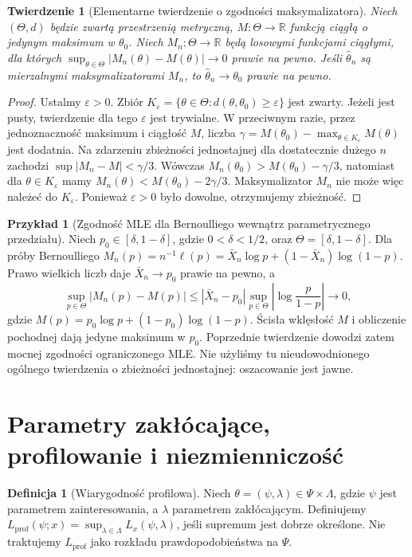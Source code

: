 \documentclass[11pt,a4paper,oneside]{report}
\numberwithin{equation}{chapter}
\theoremstyle{plain}
\newtheorem{twierdzenie}{Twierdzenie}[chapter]
\theoremstyle{definition}
\newtheorem{definicja}{Definicja}[chapter]
\newtheorem{przyklad}{Przykład}[chapter]
\theoremstyle{remark}
\newcommand{\R}{\mathbb R}
\begin{document}
\begin{twierdzenie}[Elementarne twierdzenie o zgodności maksymalizatora]\label{thm:argmax-consistency}
Niech $(\Theta,d)$ będzie zwartą przestrzenią metryczną,
$M:\Theta\to\R$ funkcją ciągłą o jedynym maksimum w $\theta_0$.
Niech $M_n:\Theta\to\R$ będą losowymi funkcjami ciągłymi, dla których
$\sup_{\theta\in\Theta}|M_n(\theta)-M(\theta)|\to0$ prawie na pewno.
Jeśli $\widehat\theta_n$ są mierzalnymi maksymalizatorami $M_n$, to
$\widehat\theta_n\to\theta_0$ prawie na pewno.
\end{twierdzenie}
\begin{proof}
Ustalmy $\varepsilon>0$. Zbiór
$K_\varepsilon=\{\theta\in\Theta:d(\theta,\theta_0)\ge\varepsilon\}$
jest zwarty. Jeżeli jest pusty, twierdzenie dla tego $\varepsilon$
jest trywialne. W przeciwnym razie, przez jednoznaczność maksimum
i ciągłość $M$, liczba
$\gamma=M(\theta_0)-\max_{\theta\in K_\varepsilon}M(\theta)$
jest dodatnia. Na zdarzeniu zbieżności jednostajnej dla dostatecznie
dużego $n$ zachodzi $\sup|M_n-M|<\gamma/3$.
Wówczas $M_n(\theta_0)>M(\theta_0)-\gamma/3$, natomiast dla
$\theta\in K_\varepsilon$ mamy
$M_n(\theta)<M(\theta_0)-2\gamma/3$.
Maksymalizator $M_n$ nie może więc należeć do $K_\varepsilon$.
Ponieważ $\varepsilon>0$ było dowolne, otrzymujemy zbieżność.
\end{proof}

\begin{przyklad}[Zgodność MLE dla Bernoulliego wewnątrz parametrycznego przedziału]
Niech $p_0\in[\delta,1-\delta]$, gdzie $0<\delta<1/2$, oraz
$\Theta=[\delta,1-\delta]$. Dla próby Bernoulliego
$M_n(p)=n^{-1}\ell(p)=\bar X_n\log p+(1-\bar X_n)\log(1-p)$.
Prawo wielkich liczb daje $\bar X_n\to p_0$ prawie na pewno, a
\[
\sup_{p\in\Theta}|M_n(p)-M(p)|
\le |\bar X_n-p_0|
\sup_{p\in\Theta}\left|\log\frac p{1-p}\right|\longrightarrow0,
\]
gdzie $M(p)=p_0\log p+(1-p_0)\log(1-p)$.
Ścisła wklęsłość $M$ i obliczenie pochodnej dają jedyne maksimum
w $p_0$. Poprzednie twierdzenie dowodzi zatem mocnej zgodności
ograniczonego MLE. Nie użyliśmy tu nieudowodnionego ogólnego twierdzenia
o zbieżności jednostajnej: oszacowanie jest jawne.
\end{przyklad}

\section{Parametry zakłócające, profilowanie i niezmienniczość}
\begin{definicja}[Wiarygodność profilowa]
Niech $\theta=(\psi,\lambda)\in\Psi\times\Lambda$, gdzie $\psi$ jest
parametrem zainteresowania, a $\lambda$ parametrem zakłócającym.
Definiujemy $L_{\mathrm{prof}}(\psi;x)=\sup_{\lambda\in\Lambda}
L_x(\psi,\lambda)$, jeśli supremum jest dobrze określone.
Nie traktujemy $L_{\mathrm{prof}}$ jako rozkładu prawdopodobieństwa na $\Psi$.
\end{definicja}
\end{document}
